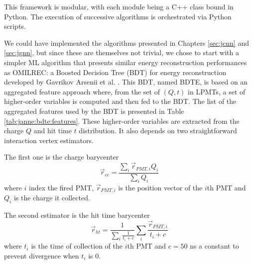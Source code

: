 \documentclass[../main.tex]{subfiles}
\begin{document}
This framework is modular, with each module being a C++ class bound in Python. The execution of successive algorithms is orchestrated via Python scripts.


We could have implemented the algorithms presented in Chapters \ref{sec:jcnn} and \ref{sec:jgnn}, but since these are themselves not trivial, we chose to start with a simpler ML algorithm that presents similar energy reconstruction performances as OMILREC: a Boosted Decision Tree (BDT) for energy reconstruction developed by Gavrikov Arsenii et al. \cite{gavrikov_energy_2022}.
This BDT, named BDTE, is based on an aggregated feature approach where, from the set of $(Q, t)$ in LPMTs, a set of higher-order variables is computed and then fed to the BDT. The list of the aggregated features used by the BDT is presented in Table \ref{tab:janne:bdte:features}. These higher-order variables are extracted from the charge $Q$ and hit time $t$ distribution. It also depends on two straightforward interaction vertex estimators.


The first one is the charge barycenter
\begin{equation}
  \label{eq:janne:bdte:cc}
  \vec{r}_{cc} = \frac{\sum_i \vec{r}_{PMT,i} Q_i}{\sum_i Q_i}
\end{equation}
where $i$ index the fired PMT, $\vec{r}_{PMT, i}$ is the position vector of the $i$th PMT and $Q_i$ is the charge it collected.

The second estimator is the hit time barycenter
\begin{equation}
  \label{eq:janne:bdt:cht}
  \vec{r}_{ht} = \frac{1}{\sum_i \frac{1}{t_i + c}} \sum_i \frac{\vec{r}_{PMT, i}}{t_i + c}
\end{equation}
where $t_i$ is the time of collection of the $i$th PMT and $c = 50$ ns a constant to prevent divergence when $t_i$ is 0.
\end{document}
